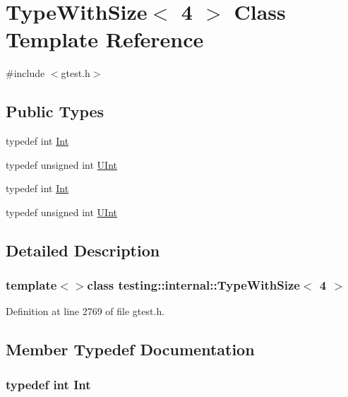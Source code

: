 \hypertarget{classtesting_1_1internal_1_1TypeWithSize_3_014_01_4}{\section{\-Type\-With\-Size$<$ 4 $>$ \-Class \-Template \-Reference}
\label{d4/d83/classtesting_1_1internal_1_1TypeWithSize_3_014_01_4}
}


{\ttfamily \#include $<$gtest.\-h$>$}

\subsection*{\-Public \-Types}
\begin{DoxyCompactItemize}
\item 
typedef int \hyperlink{classtesting_1_1internal_1_1TypeWithSize_3_014_01_4_a7cc214a236ad3bb6ad435bdcf5262a3f}{\-Int}
\item 
typedef unsigned int \hyperlink{classtesting_1_1internal_1_1TypeWithSize_3_014_01_4_aba0996d26f7be2572973245b51852757}{\-U\-Int}
\item 
typedef int \hyperlink{classtesting_1_1internal_1_1TypeWithSize_3_014_01_4_a7cc214a236ad3bb6ad435bdcf5262a3f}{\-Int}
\item 
typedef unsigned int \hyperlink{classtesting_1_1internal_1_1TypeWithSize_3_014_01_4_aba0996d26f7be2572973245b51852757}{\-U\-Int}
\end{DoxyCompactItemize}


\subsection{\-Detailed \-Description}
\subsubsection*{template$<$$>$class testing\-::internal\-::\-Type\-With\-Size$<$ 4 $>$}



\-Definition at line 2769 of file gtest.\-h.



\subsection{\-Member \-Typedef \-Documentation}
\hypertarget{classtesting_1_1internal_1_1TypeWithSize_3_014_01_4_a7cc214a236ad3bb6ad435bdcf5262a3f}{
\subsubsection[{\-Int}]{\setlength{\rightskip}{0pt plus 5cm}typedef int {\bf \-Int}}}\label{d4/d83/classtesting_1_1internal_1_1TypeWithSize_3_014_01_4_a7cc214a236ad3bb6ad435bdcf5262a3f}


